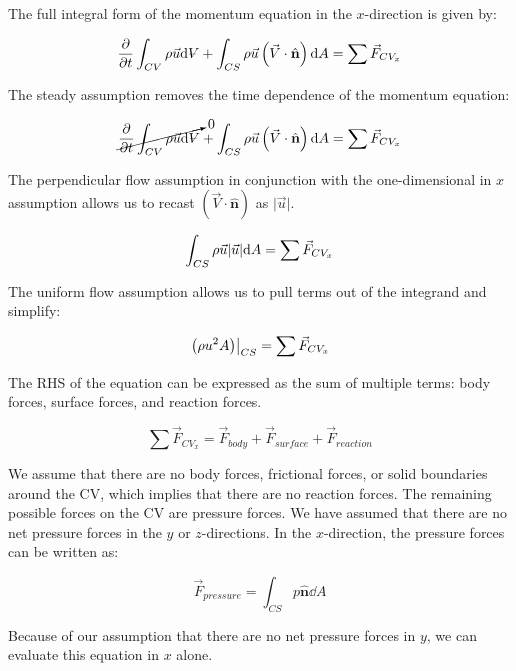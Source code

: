 \documentclass[../main.tex]{subfiles}
\begin{document}
\begin{enumerate}[label = (\alph*)]
        The full integral form of the momentum equation in the \(x\)-direction is given by:

        \[
            \pdv{t} \int_{CV} \rho \vec{u} \dd \volume +%
            \int_{CS} \rho \vec{u} \left({\vec{V} \cdot \hat{\mathbf{n}}}\right) \dd A =%
            \sum{\vec{F}_{CV_x}}\\  
        \]

        The steady assumption removes the time dependence of the momentum equation:

        \[
            \cancelto{0}{\pdv{t} \int_{CV} \rho \vec{u} \dd \volume} +%
            \int_{CS} \rho \vec{u} \left({\vec{V} \cdot \hat{\mathbf{n}}}\right) \dd A =%
            \sum{\vec{F}_{CV_x}}\\  
        \]

        The perpendicular flow assumption in conjunction with the one-dimensional in \(x\) assumption allows us to recast  \(\left({\vec{V} \cdot \hat{\mathbf{n}}}\right)\) as \(\lvert\vec{u}\rvert\).

        \[
            \int_{CS} \rho \vec{u} \lvert\vec{u}\rvert \dd A =%
            \sum{\vec{F}_{CV_x}}\\  
        \]

        The uniform flow assumption allows us to pull terms out of the integrand and simplify:

        \[
            \left.\left(\rho u^2 A\right)\right|_{CS} =%
            \sum{\vec{F}_{CV_x}}\\  
        \]

        The RHS of the equation can be expressed as the sum of multiple terms: body forces, surface forces, and reaction forces. 

        \[
            \sum{\vec{F}_{CV_x}} = \vec{F}_{body} + \vec{F}_{surface} + \vec{F}_{reaction}
        \]

        We assume that there are no body forces, frictional forces, or solid boundaries around the CV, which implies that there are no reaction forces.
        The remaining possible forces on the CV are pressure forces. 
        We have assumed that there are no net pressure forces in the \(y\) or \(z\)-directions.
        In the \(x\)-direction, the pressure forces can be written as:

        \[
            \vec{F}_{pressure} = \int_{CS} p \hat{\mathbf{n}} \dd A  
        \]

        Because of our assumption that there are no net pressure forces in \(y\), we can evaluate this equation in \(x\) alone.


\end{enumerate}
\end{document}
